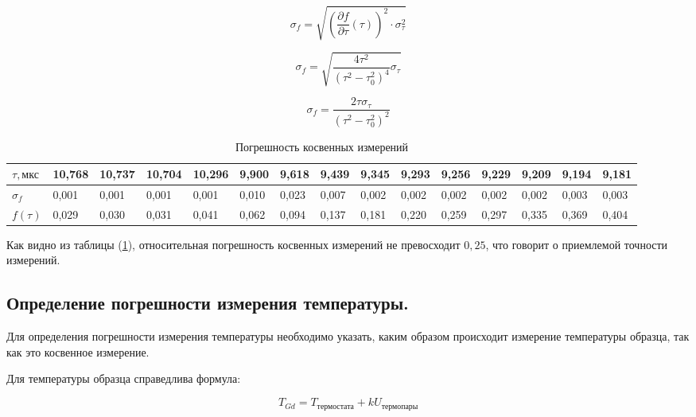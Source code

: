\documentclass[10pt,a4paper]{article}
\begin{document}
		\begin{equation}
			\sigma_{f}  = \sqrt{\left(\frac{\partial f}{\partial \tau}\left(\tau\right)\right)^{2} \cdot \sigma^{2}_{\tau}}
		\end{equation}
		
		\begin{equation}
			\sigma_{f}  = \sqrt{\frac{4\tau^{2}}{\left(\tau^{2} - \tau^{2}_{0}\right)^{4}}\sigma_{\tau}}
		\end{equation}
		
		\begin{equation}
			\sigma_{f}  = \frac{2\tau \sigma_{\tau}}{\left(\tau^{2} - \tau^{2}_{0}\right)^{2}}
		\end{equation}
		

		\begin{table}[h!]
\hspace{-1cm}
\begin{tabular}{|l|l|l|l|l|l|l|l|l|l|l|l|l|l|l|}
\hline
$\tau, \text{мкс}$               & 10,768 & 10,737 & 10,704 & 10,296 & 9,900 & 9,618 & 9,439 & 9,345 & 9,293 & 9,256 & 9,229 & 9,209 & 9,194 & 9,181 \\ \hline
$\sigma_{f}$          & 0,001  & 0,001  & 0,001  & 0,001  & 0,010 & 0,023 & 0,007 & 0,002 & 0,002 & 0,002 & 0,002 & 0,002 & 0,003 & 0,003 \\ \hline
$f\left(\tau\right)$ & 0,029  & 0,030  & 0,031  & 0,041  & 0,062 & 0,094 & 0,137 & 0,181 & 0,220 & 0,259 & 0,297 & 0,335 & 0,369 & 0,404 \\ \hline
\end{tabular}
\caption{Погрешность косвенных измерений}
\label{tab:error_of_f}
\end{table}

	Как видно из таблицы (\ref{tab:error_of_f}), относительная погрешность косвенных измерений не превосходит $0,25$, что говорит о приемлемой точности измерений.
	
	\subsection{Определение погрешности измерения температуры.}
	
	Для определения погрешности измерения температуры необходимо указать, каким образом происходит измерение температуры образца, так как это косвенное измерение.
	
	Для температуры образца справедлива формула:
	
	\begin{equation}
		T_{Gd} = T_{\text{термостата}} + kU_{\text{термопары}}
	\end{equation}
	
\end{document}
